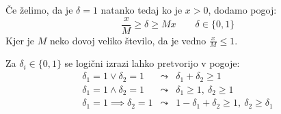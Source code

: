 \documentclass[a4paper,8pt]{extarticle}
\begin{document}
\begin{multicols}{4}
Če želimo, da je $\delta = 1$ natanko tedaj ko je $x > 0$, dodamo pogoj:
\[ \frac{x}{M} \geq \delta \geq M x \qquad \delta \in \{0,1\}\]
Kjer je $M$ neko dovoj veliko število, da je vedno $\frac{x}{M} \leq 1$.

Za $\delta_i \in \{0,1\}$ se logični izrazi lahko pretvorijo v pogoje:
\begin{align*}
	\delta_1 = 1 \vee \delta_2 = 1 &\leadsto& \delta_1 + \delta_2 \geq 1 \\
	\delta_1 = 1 \wedge \delta_2 = 1 &\leadsto& \delta_1 \geq 1, \  \delta_2 \geq 1 \\
	\delta_1 = 1 \implies \delta_2 = 1 &\leadsto& 1 - \delta_1 + \delta_2 \geq 1, \ \delta_2 \geq \delta_1 \\
\end{align*}
\end{multicols}
\end{document}
